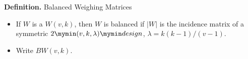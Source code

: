 \documentclass{beamer}
\newcommand{\bibd}[1]{2 \mymin #1 \mymin design}
\newcommand{\abs}[1]{|#1|}
\begin{document}




\begin{frame}

  \begin{block}{{\bf Definition.} Balanced Weighing Matrices}
    \begin{itemize}
    \item If $W$ is a $W(v,k)$, then $W$ is balanced if $\abs{W}$ is the incidence
    matrix of a symmetric $\bibd{(v,k,\lambda)}$, $\lambda=k(k-1)/(v-1)$.
    \item Write $BW(v,k)$.
    \end{itemize}
  \end{block}

\end{frame}
\end{document}
